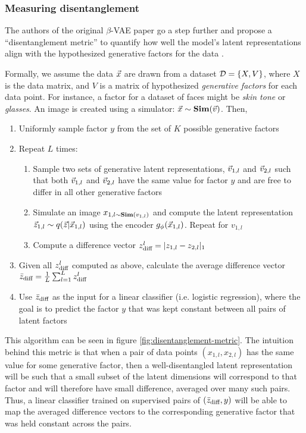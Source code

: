 \subsubsection{Measuring disentanglement}

The authors of the original $\beta$-VAE paper go a step further and propose a ``disentanglement metric'' to quantify how well the model's latent representations align with the hypothesized generative factors for the data \cite{higgins2016beta}.

Formally, we assume the data $\vec{x}$ are drawn from a dataset $\mathcal{D}=\{X, V\}$, where $X$ is the data matrix, and $V$ is a matrix of hypothesized {\it generative factors} for each data point. For instance, a factor for a dataset of faces might be {\it skin tone} or {\it glasses}. An image is created using a simulator: $\vec{x}\sim\mathbf{Sim}(\vec{v})$. Then,
\begin{enumerate}
    \item Uniformly sample factor $y$ from the set of $K$ possible generative factors
    \item Repeat $L$ times:
    \begin{enumerate}
        \item Sample two sets of generative latent representations, $\vec{v}_{1,l}$ and $\vec{v}_{2,l}$ such that both $\vec{v}_{1,l}$ and $\vec{v}_{2,l}$ have the same value for factor $y$ and are free to differ in all other generative factors
        \item Simulate an image $x_{1,l\sim\mathbf{Sim}(v_{1,l})}$ and compute the latent representation $\vec{z}_{1,l}\sim q(\vec{z}|\vec{x}_{1,l})$ using the encoder $g_\phi(\vec{x}_{1,l})$. Repeat for $v_{1,l}$
        \item Compute a difference vector $z^l_{\text{diff}}=|z_{1,l}-z_{2,l}|_1$
    \end{enumerate}
    \item Given all $z^l_{\text{diff}}$ computed as above, calculate the average difference vector $\bar{z}_{\text{diff}} = \frac{1}{L}\sum_{l=1}^Lz^l_{\text{diff}}$
    \item Use $\bar{z}_{\text{diff}}$ as the input for a linear classifier (i.e. logistic regression), where the goal is to predict the factor $y$ that was kept constant between all pairs of latent factors
\end{enumerate}

This algorithm can be seen in figure \ref{fig:disentanglement-metric}. The intuition behind this metric is that when a pair of data points $(x_{1,l}, x_{2,l})$ has the same value for some generative factor, then a well-disentangled latent representation will be such that a small subset of the latent dimensions will correspond to that factor and will therefore have small difference, averaged over many such pairs. Thus, a linear classifier trained on supervised pairs of $(\bar{z}_{\text{diff}}, y)$ will be able to map the averaged difference vectors to the corresponding generative factor that was held constant across the pairs.

